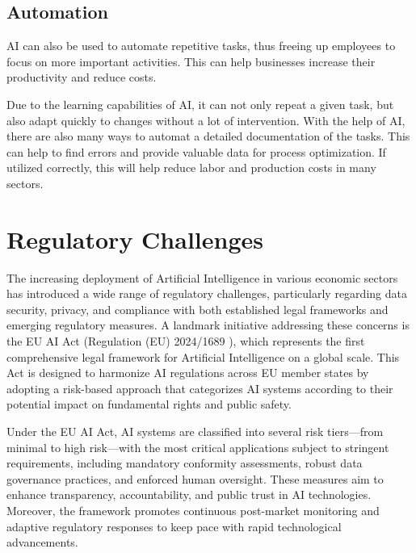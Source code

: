 \cite{AiDataAnalysis}

\subsection{Automation}
\label{subsec:automation}

AI can also be used to automate repetitive tasks, thus freeing up employees to focus on more important activities.
This can help businesses increase their productivity and reduce costs.

Due to the learning capabilities of AI, it can not only repeat a given task, but also adapt quickly to changes without a lot of intervention.
With the help of AI, there are also many ways to automat a detailed documentation of the tasks. This can help to find errors and provide valuable data for process optimization. 
If utilized correctly, this will help reduce labor and production costs in many sectors. 

\cite{AiAutomation}

\section{Regulatory Challenges}
\label{sec:regulatory-challanges}

The increasing deployment of Artificial Intelligence in various economic sectors has introduced a wide range of regulatory challenges, particularly regarding data security, privacy, and compliance with both established legal frameworks and emerging regulatory measures. A landmark initiative addressing these concerns is the EU AI Act (Regulation (EU) 2024/1689 \cite{EU-AI-Act-text}), which represents the first comprehensive legal framework for Artificial Intelligence on a global scale. This Act is designed to harmonize AI regulations across EU member states by adopting a risk-based approach that categorizes AI systems according to their potential impact on fundamental rights and public safety.

Under the EU AI Act, AI systems are classified into several risk tiers—from minimal to high risk—with the most critical applications subject to stringent requirements, including mandatory conformity assessments, robust data governance practices, and enforced human oversight. These measures aim to enhance transparency, accountability, and public trust in AI technologies. Moreover, the framework promotes continuous post-market monitoring and adaptive regulatory responses to keep pace with rapid technological advancements.

